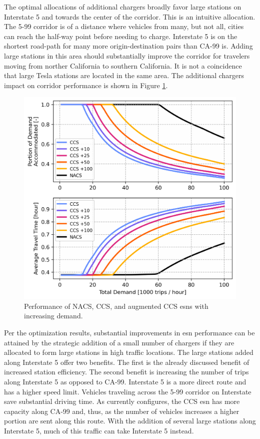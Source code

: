 The optimal allocations of additional chargers broadly favor large stations on Interstate 5 and towards the center of the corridor. This is an intuitive allocation. The 5-99 corridor is of a distance where vehicles from many, but not all, cities can reach the half-way point before needing to charge. Interstate 5 is on the shortest road-path for many more origin-destination pairs than CA-99 is. Adding large stations in this area should substantially improve the corridor for travelers moving from norther California to southern California. It is not a coincidence that large Tesla stations are located in the same area. The additional chargers impact on corridor performance is shown in Figure \ref{fig:augmented_esn_performance}.

\begin{figure}[H]
	\centering
	\includegraphics[width = \linewidth]{./figures/augmented_esn_performance.png}
	\caption{Performance of NACS, CCS, and augmented CCS \glspl{esn} with increasing demand.}
	\label{fig:augmented_esn_performance}
\end{figure}

Per the optimization results, substantial improvements in \gls{esn} performance can be attained by the strategic addition of a small number of chargers if they are allocated to form large stations in high traffic locations. The large stations added along Interstate 5 offer two benefits. The first is the already discussed benefit of increased station efficiency. The second benefit is increasing the number of trips along Interstate 5 as opposed to CA-99. Interstate 5 is a more direct route and has a higher speed limit. Vehicles traveling across the 5-99 corridor on Interstate save substantial driving time. As currently configures, the CCS \gls{esn} has more capacity along CA-99 and, thus, as the number of vehicles increases a higher portion are sent along this route. With the addition of several large stations along Interstate 5, much of this traffic can take Interstate 5 instead.




